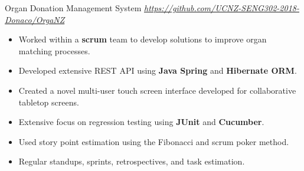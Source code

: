 \begin{cvsubsection}[3]{Organ Donation Management System}{}{}
    \textit{\url{https://github.com/UCNZ-SENG302-2018-Donaco/OrgaNZ}}
	\begin{itemize}
	    \item Worked within a \textbf{scrum} team to develop solutions to improve organ matching processes.
	    \item Developed extensive REST API using \textbf{Java Spring} and \textbf{Hibernate ORM}.
	    \item Created a novel multi-user touch screen interface developed for collaborative tabletop screens.
	    \item Extensive focus on regression testing using \textbf{JUnit} and \textbf{Cucumber}.
	    \item Used story point estimation using the Fibonacci and scrum poker method.
	    \item Regular standups, sprints, retrospectives, and task estimation.
	\end{itemize}
\end{cvsubsection}